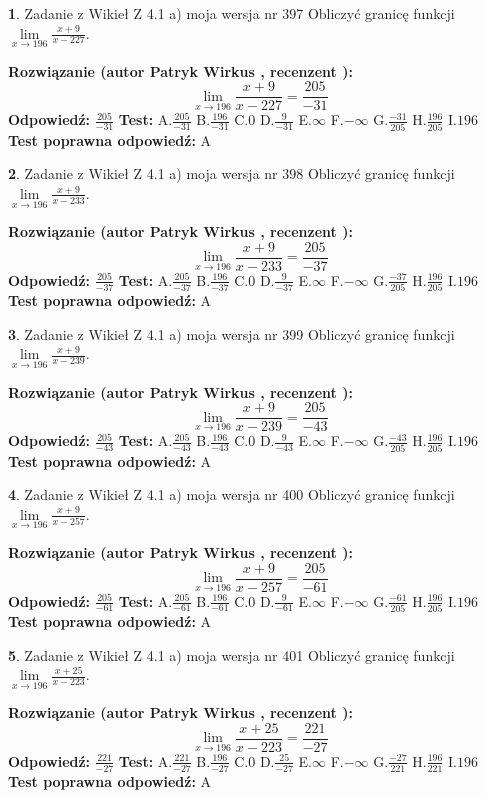 \documentclass[12pt, a4paper]{article}
\theoremstyle{definition} %
\newtheorem{zad}{}
\newcommand{\zadStart}[1]{\begin{zad}#1\newline}
\newcommand{\zadStop}{\end{zad}}
\newcommand{\rozwStart}[2]{\noindent \textbf{Rozwiązanie (autor #1 , recenzent #2): }\newline}
\newcommand{\rozwStop}{\newline}
\newcommand{\odpStart}{\noindent \textbf{Odpowiedź:}\newline}
\newcommand{\odpStop}{\newline}
\newcommand{\testStart}{\noindent \textbf{Test:}\newline}
\newcommand{\testStop}{\newline}
\newcommand{\kluczStart}{\noindent \textbf{Test poprawna odpowiedź:}\newline}
\newcommand{\kluczStop}{\newline}
\begin{document}
\zadStart{Zadanie z Wikieł Z 4.1 a) moja wersja nr 397}
Obliczyć granicę funkcji $\lim\limits_{x\to196}\frac{x+9}{x-227}$.
\zadStop
\rozwStart{Patryk Wirkus}{}
$$\lim\limits_{x\to196}\frac{x+9}{x-227} = \frac{205}{-31}$$
\rozwStop
\odpStart
$\frac{205}{-31}$
\odpStop
\testStart
A.$\frac{205}{-31}$
B.$\frac{196}{-31}$
C.$0$
D.$\frac{9}{-31}$
E.$\infty$
F.$-\infty$
G.$\frac{-31}{205}$
H.$\frac{196}{205}$
I.$196$
\testStop
\kluczStart
A
\kluczStop



\zadStart{Zadanie z Wikieł Z 4.1 a) moja wersja nr 398}
Obliczyć granicę funkcji $\lim\limits_{x\to196}\frac{x+9}{x-233}$.
\zadStop
\rozwStart{Patryk Wirkus}{}
$$\lim\limits_{x\to196}\frac{x+9}{x-233} = \frac{205}{-37}$$
\rozwStop
\odpStart
$\frac{205}{-37}$
\odpStop
\testStart
A.$\frac{205}{-37}$
B.$\frac{196}{-37}$
C.$0$
D.$\frac{9}{-37}$
E.$\infty$
F.$-\infty$
G.$\frac{-37}{205}$
H.$\frac{196}{205}$
I.$196$
\testStop
\kluczStart
A
\kluczStop



\zadStart{Zadanie z Wikieł Z 4.1 a) moja wersja nr 399}
Obliczyć granicę funkcji $\lim\limits_{x\to196}\frac{x+9}{x-239}$.
\zadStop
\rozwStart{Patryk Wirkus}{}
$$\lim\limits_{x\to196}\frac{x+9}{x-239} = \frac{205}{-43}$$
\rozwStop
\odpStart
$\frac{205}{-43}$
\odpStop
\testStart
A.$\frac{205}{-43}$
B.$\frac{196}{-43}$
C.$0$
D.$\frac{9}{-43}$
E.$\infty$
F.$-\infty$
G.$\frac{-43}{205}$
H.$\frac{196}{205}$
I.$196$
\testStop
\kluczStart
A
\kluczStop



\zadStart{Zadanie z Wikieł Z 4.1 a) moja wersja nr 400}
Obliczyć granicę funkcji $\lim\limits_{x\to196}\frac{x+9}{x-257}$.
\zadStop
\rozwStart{Patryk Wirkus}{}
$$\lim\limits_{x\to196}\frac{x+9}{x-257} = \frac{205}{-61}$$
\rozwStop
\odpStart
$\frac{205}{-61}$
\odpStop
\testStart
A.$\frac{205}{-61}$
B.$\frac{196}{-61}$
C.$0$
D.$\frac{9}{-61}$
E.$\infty$
F.$-\infty$
G.$\frac{-61}{205}$
H.$\frac{196}{205}$
I.$196$
\testStop
\kluczStart
A
\kluczStop



\zadStart{Zadanie z Wikieł Z 4.1 a) moja wersja nr 401}
Obliczyć granicę funkcji $\lim\limits_{x\to196}\frac{x+25}{x-223}$.
\zadStop
\rozwStart{Patryk Wirkus}{}
$$\lim\limits_{x\to196}\frac{x+25}{x-223} = \frac{221}{-27}$$
\rozwStop
\odpStart
$\frac{221}{-27}$
\odpStop
\testStart
A.$\frac{221}{-27}$
B.$\frac{196}{-27}$
C.$0$
D.$\frac{25}{-27}$
E.$\infty$
F.$-\infty$
G.$\frac{-27}{221}$
H.$\frac{196}{221}$
I.$196$
\testStop
\kluczStart
A
\kluczStop
\end{document}
